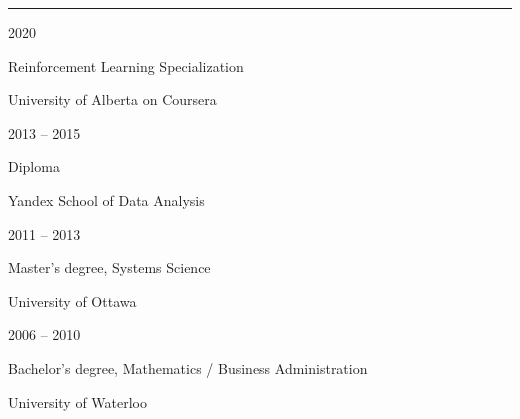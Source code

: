 \documentclass[a4paper,10pt]{article}
\newlength{\cvcolumngapwidth}
\newlength{\cvleftcolumnwidth}
\newlength{\cvrightcolumnwidth}
\newcommand{\cvsectionstyle}[1]{{\normalsize\cvsectionfont\textcolor{cvsectioncolor}{#1}}}
\newcommand{\cvtitlestyle}[1]{{\large\cvtitlefont\textcolor{cvtitlecolor}{#1}}}
\newcommand{\cvdurationstyle}[1]{{\small\cvdurationfont\textcolor{cvdurationcolor}{#1}}}
\newlength{\cvafteritemskipamount}
\newlength{\cvaftersectionskipamount}
\newlength{\cvaftertitleskipamount}
\newlength{\cvparskip}
\newcommand{\cvsection}[1]{
    \begin{minipage}[t]{\cvleftcolumnwidth}
        \raggedleft\cvsectionstyle{#1}
    \end{minipage}%
    \hspace{\cvcolumngapwidth}%
    \begin{minipage}[t]{\cvrightcolumnwidth}
        \textcolor{cvrulecolor}{\rule{\cvrightcolumnwidth}{0.3mm}}
    \end{minipage}

    \vspace{\cvaftersectionskipamount}
}
\newcommand{\cvitem}[2]{
    \begin{minipage}[t]{\cvleftcolumnwidth}
        \raggedleft #1
    \end{minipage}%
    \hspace{\cvcolumngapwidth}%
    \begin{minipage}[t]{\cvrightcolumnwidth}
        \setlength{\parskip}{\cvparskip} #2
    \end{minipage}

    \vspace{\cvafteritemskipamount}
}
\newcommand{\cvtitle}[1]{
    \cvtitlestyle{#1}

    \vspace{\cvaftertitleskipamount}
    \vspace{-\cvparskip}
}
\begin{document}

\cvsection{EDUCATION}

\cvitem{
    \cvdurationstyle{2020}
}{
    \cvtitle{Reinforcement Learning Specialization}
    University of Alberta on Coursera
}

\cvitem{
    \cvdurationstyle{2013 -- 2015}
}{
    \cvtitle{Diploma}
    Yandex School of Data Analysis
}

\cvitem{
    \cvdurationstyle{2011 -- 2013}
}{
    \cvtitle{Master's degree, Systems Science}
    University of Ottawa
}

\cvitem{
    \cvdurationstyle{2006 -- 2010}
}{
    \cvtitle{Bachelor's degree, Mathematics / Business Administration}
    University of Waterloo
}
\end{document}
